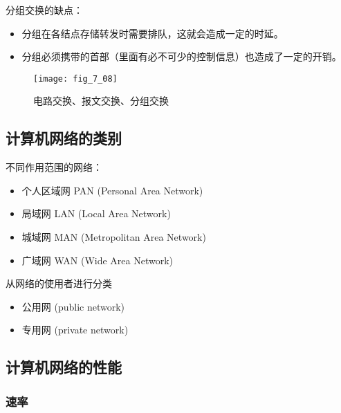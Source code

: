分组交换的缺点：
\begin{itemize}
  \item 分组在各结点存储转发时需要排队，这就会造成一定的时延。


  \item 分组必须携带的首部（里面有必不可少的控制信息）也造成了一定的开销。

\end{itemize}

\begin{figure}
  \centering
  \texttt{[image: fig\_7\_08]}
  \caption{电路交换、报文交换、分组交换}\label{fig_7_08}
\end{figure}



\subsection{计算机网络的类别}

不同作用范围的网络：
\begin{itemize}
  \item 个人区域网 PAN (Personal Area Network)

  \item 局域网 LAN (Local Area Network)

  \item 城域网 MAN (Metropolitan Area Network)

  \item 广域网 WAN (Wide Area Network)

\end{itemize}

从网络的使用者进行分类

\begin{itemize}
  \item 公用网 (public network)

  \item 专用网 (private network)

\end{itemize}


\subsection{计算机网络的性能}

\subsubsection{速率}

